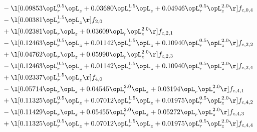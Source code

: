 \begin{alignat}{2}
& - \l[  0.09853 \opL_r^{0.5} \opL_z +  0.03680 \opL_r^{1.5} \opL_z +  0.04946 \opL_r^{0.5} \opL_z^{2.0}  \r] f_{c,0,4} \nonumber \\ 
& - \l[  0.00381 \opL_r^{1.5} \opL_z  \r] f_{2,0} \nonumber \\ 
& + \l[  0.02381 \opL_r \opL_z +  0.03609 \opL_r \opL_z^{2.0}  \r] f_{c,2,1} \nonumber \\ 
& - \l[  0.12463 \opL_r^{0.5} \opL_z +  0.01142 \opL_r^{1.5} \opL_z +  0.10940 \opL_r^{0.5} \opL_z^{2.0}  \r] f_{c,2,2} \nonumber \\ 
& + \l[  0.04762 \opL_r \opL_z +  0.05990 \opL_r \opL_z^{2.0}  \r] f_{c,2,3} \nonumber \\ 
& - \l[  0.12463 \opL_r^{0.5} \opL_z +  0.01142 \opL_r^{1.5} \opL_z +  0.10940 \opL_r^{0.5} \opL_z^{2.0}  \r] f_{c,2,4} \nonumber \\ 
& + \l[  0.02337 \opL_r^{1.5} \opL_z  \r] f_{4,0} \nonumber \\ 
& - \l[  0.05714 \opL_r \opL_z +  0.04545 \opL_r^{2.0} \opL_z +  0.03194 \opL_r \opL_z^{2.0}  \r] f_{c,4,1} \nonumber \\ 
& + \l[  0.11325 \opL_r^{0.5} \opL_z +  0.07012 \opL_r^{1.5} \opL_z +  0.01975 \opL_r^{0.5} \opL_z^{2.0}  \r] f_{c,4,2} \nonumber \\ 
& - \l[  0.11429 \opL_r \opL_z +  0.05455 \opL_r^{2.0} \opL_z +  0.05272 \opL_r \opL_z^{2.0}  \r] f_{c,4,3} \nonumber \\ 
& + \l[  0.11325 \opL_r^{0.5} \opL_z +  0.07012 \opL_r^{1.5} \opL_z +  0.01975 \opL_r^{0.5} \opL_z^{2.0}  \r] f_{c,4,4} \nonumber \\ 
\end{alignat} 


